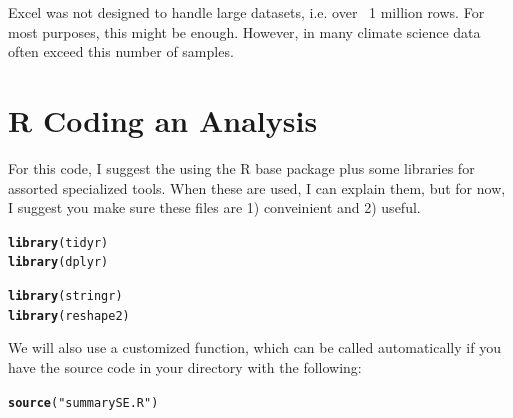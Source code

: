 \documentclass{article}\usepackage[]{graphicx}\usepackage[]{color}
\makeatletter
\newcommand{\hlstr}[1]{\textcolor[rgb]{0.192,0.494,0.8}{#1}}%
\newcommand{\hlstd}[1]{\textcolor[rgb]{0.345,0.345,0.345}{#1}}%
\newcommand{\hlkwd}[1]{\textcolor[rgb]{0.737,0.353,0.396}{\textbf{#1}}}%
\newenvironment{kframe}{%
 \def\at@end@of@kframe{}%
 \ifinner\ifhmode%
  \def\at@end@of@kframe{\end{minipage}}%
  \begin{minipage}{\columnwidth}%
 \fi\fi%
 \def\FrameCommand##1{\hskip\@totalleftmargin \hskip-\fboxsep
 \colorbox{shadecolor}{##1}\hskip-\fboxsep
     \hskip-\linewidth \hskip-\@totalleftmargin \hskip\columnwidth}%
 \MakeFramed {\advance\hsize-\width
   \@totalleftmargin\z@ \linewidth\hsize
   \@setminipage}}%
 {\par\unskip\endMakeFramed%
 \at@end@of@kframe}
\newenvironment{knitrout}{}{} %
\makeatother
\begin{document}
Excel was not designed to handle large datasets, i.e. over ~1 million rows. For most purposes, this might be enough. However, in many climate science data often exceed this number of samples. 

\section{R Coding an Analysis}

For this code, I suggest the using the R base package plus some libraries for assorted specialized tools. When these are used, I can explain them, but for now, I suggest you make sure these files are 1) conveinient and 2) useful. 

\begin{knitrout}
\color{fgcolor}\begin{kframe}
\begin{alltt}
\hlkwd{library}\hlstd{(tidyr)}
\hlkwd{library}\hlstd{(dplyr)}
\end{alltt}


{\ttfamily\noindent\itshape\color{messagecolor}{\#\# \\\#\# Attaching package: 'dplyr'\\\#\# \\\#\# The following objects are masked from 'package:stats':\\\#\# \\\#\#\ \ \ \  filter, lag\\\#\# \\\#\# The following objects are masked from 'package:base':\\\#\# \\\#\#\ \ \ \  intersect, setdiff, setequal, union}}\begin{alltt}
\hlkwd{library}\hlstd{(stringr)}
\hlkwd{library}\hlstd{(reshape2)}
\end{alltt}
\end{kframe}
\end{knitrout}

We will also use a customized function, which can be called automatically if you have the source code in your directory with the following: 

\begin{knitrout}
\color{fgcolor}\begin{kframe}
\begin{alltt}
\hlkwd{source}\hlstd{(}\hlstr{"summarySE.R"}\hlstd{)}
\end{alltt}
\end{kframe}
\end{knitrout}
\end{document}

